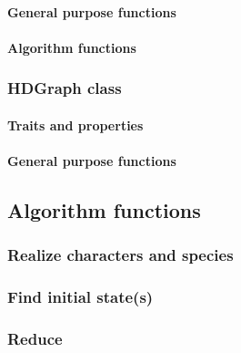 \paragraph{General purpose functions}

\paragraph{Algorithm functions}

\subsubsection{HDGraph class}

\paragraph{Traits and properties}

\paragraph{General purpose functions}

\subsection{Algorithm functions}

\subsubsection{Realize characters and species}

\subsubsection{Find initial state(s)}

\subsubsection{Reduce}
